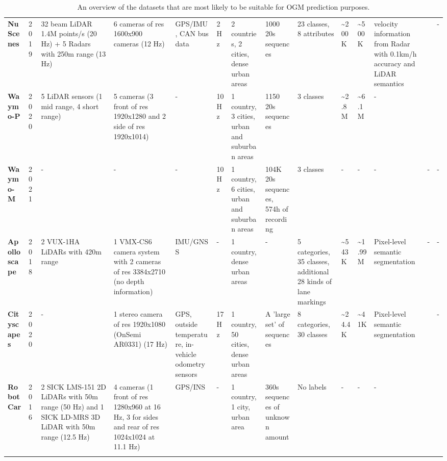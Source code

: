 {\begin{landscape}
\begin{longtable}{m{4em}m{2em}m{7em}m{7em}m{5em}m{2em}m{5em}m{7em}m{4em}m{2em}m{2em}m{5em}m{1em}m{1em}}
			\textbf{NuScenes \cite{caesar2020nuscenes}} & 2019 & 32 beam LiDAR 1.4M points/s (20 Hz) + 5 Radars with 250m range (13 Hz) & 6 cameras of res 1600x900 cameras (12 Hz) & GPS/IMU, CAN bus data & 2 Hz & 2 countries, 2 cities, dense urban areas & 1000 20s sequences & 23 classes, 8 attributes & \textasciitilde{}200K & \textasciitilde{}500K & velocity information from Radar with 0.1km/h accuracy and LiDAR semantics & \cite{roddick2020predicting} \cite{loukkal2021driving} & - \\
			\textbf{Waymo-P \cite{sun2020scalability}} & 2020 & 5 LiDAR sensors (1 mid range, 4 short range) & 5 cameras (3 front of res 1920x1280 and 2 side of res 1920x1014) & - & 10 Hz & 1 country, 3 cities, urban and suburban areas & 1150 20s sequences & 3 classes & \textasciitilde{}2.8M & \textasciitilde{}6.1M & - & \cite{lange2020attention} \cite{toyungyernsub2020double} & \cite{lange2020attention} \cite{toyungyernsub2020double} \\
			\textbf{Waymo-M \cite{ettinger2021large}} & 2021 & - & - & - & 10 Hz & 1 country, 6 cities, urban and suburban areas & 104K 20s sequences, 574h of recording & 3 classes & - & - & - & - & - \\
			\textbf{Apolloscape \cite{huang2019apolloscape}} & 2018 & 2 VUX-1HA LiDARs with 420m range & 1 VMX-CS6 camera system with 2 cameras of res 3384x2710 (no depth information) & IMU/GNSS & - & 1 country, dense urban areas & - & 5 categories, 35 classes, additional 28 kinds of lane markings & \textasciitilde{}543K & \textasciitilde{}1.99M & Pixel-level semantic segmentation & - & - \\
			\textbf{Cityscapes \cite{cordts2016cityscapes}} & 2020 & - & 1 stereo camera of res 1920x1080 (OnSemi AR0331) (17 Hz) & GPS, outside temperature, in-vehicle odometry sensors & 17 Hz & 1 country, 50 cities, dense urban areas & A 'large set' of sequences & 8 categories, 30 classes & \textasciitilde{}24.4K & \textasciitilde{}41K & Pixel-level semantic segmentation & \cite{hehn2021fast} & - \\
			\textbf{RobotCar \cite{robotcardatasetijrr}} & 2016 & 2 SICK LMS-151 2D LiDARs with 50m range (50 Hz) and 1 SICK LD-MRS 3D LiDAR with 50m range (12.5 Hz) & 4 cameras (1 front of res 1280x960 at 16 Hz, 3 for sides and rear of res 1024x1024 at 11.1 Hz) & GPS/INS & - & 1 country, 1 city, urban area & 360s sequences of unknown amount & No labels & - & - & - & \cite{dequaire2018deep} \cite{wang2020l2r} & \cite{dequaire2018deep} \\
			\bottomrule
		\caption{An overview of the datasets that are most likely to be suitable for \gls{OGM} prediction purposes.}
		\label{tab:datasets_overview}	
		\end{longtable}	
	\end{landscape}
}

